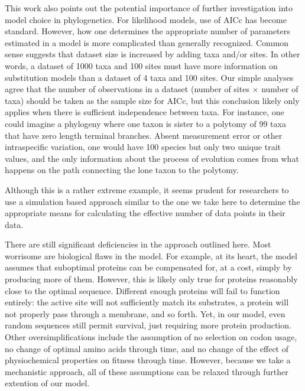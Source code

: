 \documentclass[12pt,letterpaper]{article}
\begin{document}
This work also points out the potential importance of further investigation into model choice in phylogenetics.
For likelihood models, use of AICc has become standard.
However, how one determines the appropriate number of parameters estimated in a model is more complicated than generally recognized.
Common sense suggests that dataset size is increased by adding taxa and/or sites.
In other words, a dataset of 1000 taxa and 100 sites must have more information on substitution models than a dataset of 4 taxa and 100 sites.
Our simple analyses agree that the number of observations in a dataset (number of sites $\times$ number of taxa) should be taken as the sample size for AICc, but this conclusion likely only applies when there is sufficient independence between taxa.
For instance, one could imagine a phylogeny where one taxon is sister to a polytomy of 99 taxa that have zero length terminal branches.
Absent measurement error or other intraspecific variation, one would have 100 species but only two unique trait values, and the only information about the process of evolution comes from what happens on the path connecting the lone taxon to the polytomy.

Although this is a rather extreme example, it seems prudent for researchers to use a simulation based approach similar to the one we take here to determine the appropriate means for calculating the effective number of data points in their data.

There are still significant deficiencies in the approach outlined here.
Most worrisome are biological flaws in the model.
For example, at its heart, the model assumes that suboptimal proteins can be compensated for, at a cost, simply by producing more of them.
However, this is likely only true for proteins reasonably close to the optimal sequence.
Different enough proteins will fail to function entirely: the active site will not sufficiently match its substrates, a protein will not properly pass through a membrane, and so forth.
Yet, in our model, even random sequences still permit survival, just requiring more protein production.
Other oversimplifications include the assumption of no selection on codon usage, no change of optimal amino acids through time, and no change of the effect of physiochemical properties on fitness through time.
However, because we take a mechanistic approach, all of these assumptions can be relaxed through further extention of our model.
\end{document}
